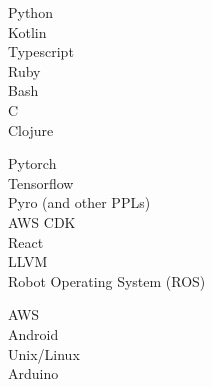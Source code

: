 \documentclass[9pt]{developercv} %
\newcommand{\CPP}
{C\nolinebreak[4]\hspace{-.05em}\raisebox{.22ex}{++ }}
\begin{document}
\begin{minipage}[t]{0.3\textwidth}
    \vspace{-\baselineskip} %


    Python\\
    Kotlin\\
    Typescript\\
    Ruby\\
    Bash\\
    \CPP \\
    Clojure
\end{minipage}
\hfill
\begin{minipage}[t]{0.3\textwidth}
    \vspace{-\baselineskip} %
    
    
    Pytorch \\
    Tensorflow \\
    Pyro (and other PPLs) \\
    AWS CDK \\
    React \\
    LLVM \\ 
    Robot Operating System (ROS)
\end{minipage}
\hfill
\begin{minipage}[t]{0.3\textwidth}
    \vspace{-\baselineskip} %
    
    
    AWS \\
    Android \\
    Unix/Linux \\
    Arduino
\end{minipage}

\end{document}
